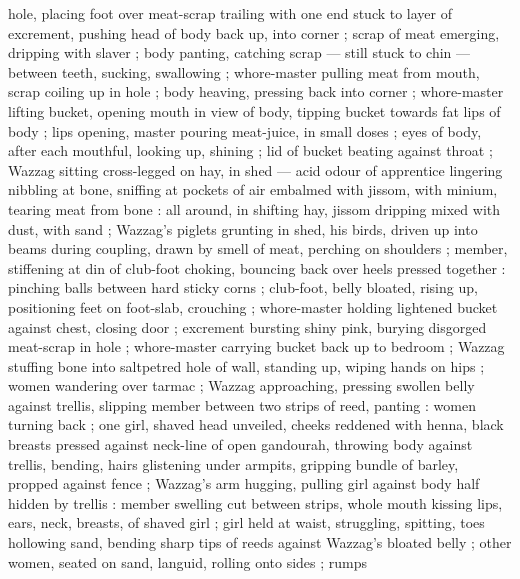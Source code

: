 hole, placing foot over meat-scrap trailing with one end stuck to layer of excrement, pushing head of body back up, into corner ; scrap of meat emerging, dripping with slaver ; body panting, catching scrap --- still stuck to chin --- between teeth, sucking, swallowing ; whore-master pulling meat from mouth, scrap coiling up in hole ; body heaving, pressing back into corner ; whore-master lifting bucket, opening mouth in view of body, tipping bucket towards fat lips of body ; lips opening, master pouring meat-juice, in small doses ; eyes of body, after each mouthful, looking up, shining ; lid of bucket beating against throat ; Wazzag sitting cross-legged on hay, in shed --- acid odour of apprentice lingering {\dashcom} nibbling at bone, sniffing at pockets of air embalmed with jissom, with minium, tearing meat from bone : all around, in shifting hay, jissom dripping mixed with dust, with sand ; Wazzag's piglets grunting in shed, his birds, driven up into beams during coupling, drawn by smell of meat, perching on shoulders ; member, stiffening at din of club-foot choking, bouncing back over heels pressed together : pinching balls between hard sticky corns ; club-foot, belly bloated, rising up, positioning feet on foot-slab, crouching ; whore-master holding lightened bucket against chest, closing door ; excrement bursting shiny pink, burying disgorged meat-scrap in hole ; whore-master carrying bucket back up to bedroom ; Wazzag stuffing bone into saltpetred hole of wall, standing up, wiping hands on hips ; women wandering over tarmac ; Wazzag approaching, pressing swollen belly against trellis, slipping member between two strips of reed, panting : women turning back ; one girl, shaved head unveiled, cheeks reddened with henna, black breasts pressed against neck-line of open gandourah, throwing body against trellis, bending, hairs glistening under armpits, gripping bundle of barley, propped against fence ; Wazzag's arm hugging, pulling girl against body half hidden by trellis : member swelling cut between strips, whole mouth kissing lips, ears, neck, breasts, of shaved girl ; girl held at waist, struggling, spitting, toes hollowing sand, bending sharp tips of reeds against Wazzag's bloated belly ; other women, seated on sand, languid, rolling onto sides ; rumps 
